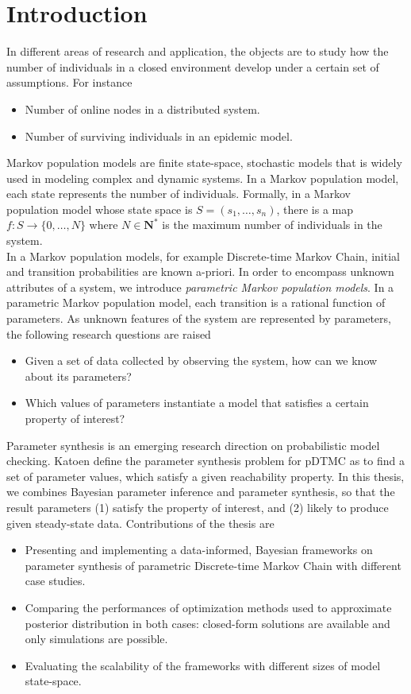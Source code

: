 \chapter{Introduction}
In different areas of research and application, the objects are to study how the number of
individuals in a closed environment develop under a certain set of assumptions. For instance
\begin{itemize}
      \item Number of online nodes in a distributed system.
      \item Number of surviving individuals in an epidemic model.
\end{itemize}
Markov population models \cite{kingman1969markov} are finite state-space, stochastic models that is
widely used in modeling complex and dynamic systems. In a Markov population model, each state
represents the number of individuals. Formally, in a Markov population model whose state space is
$S=(s_1,\ldots,s_n)$, there is a map $f:S\rightarrow\{0,\ldots,N\}$ where $N\in\mathbf{N}^*$ is the
maximum number of individuals in the system.\\
In a Markov population models, for example Discrete-time Markov Chain, initial and transition
probabilities are known a-priori. In order to encompass unknown attributes of a system, we introduce
\textit{parametric Markov population models}. In a parametric Markov population model, each
transition is a rational function of parameters. As unknown features of the system are represented
by parameters, the following research questions are raised
\begin{itemize}
      \item Given a set of data collected by observing the system, how can we know about its
            parameters?
      \item  Which values of parameters instantiate a model that satisfies a certain property of
            interest?
\end{itemize}
Parameter synthesis is an emerging research direction on probabilistic model checking. Katoen
\cite{katoen2016probabilistic} define the parameter synthesis problem for pDTMC as to find a set of
parameter values, which satisfy a given reachability property. In this thesis, we combines Bayesian
parameter inference and parameter synthesis, so that the result parameters (1) satisfy the property
of interest, and (2) likely to produce given steady-state data. Contributions of the thesis are
\begin{itemize}
      \item Presenting and implementing a data-informed, Bayesian frameworks on parameter synthesis
            of parametric Discrete-time Markov Chain with different case studies.
      \item Comparing the performances of optimization methods used to approximate posterior
            distribution in both cases: closed-form solutions are available and only simulations are
            possible.
      \item Evaluating the scalability of the frameworks with different sizes of model state-space.

\end{itemize}

